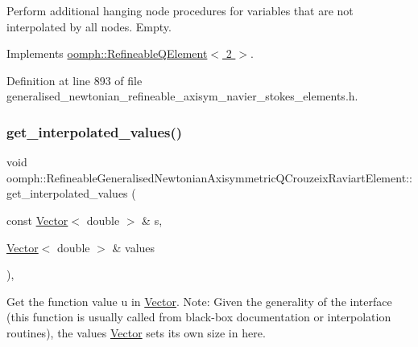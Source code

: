 Perform additional hanging node procedures for variables that are not interpolated by all nodes. Empty. 



Implements \hyperlink{classoomph_1_1RefineableQElement_3_012_01_4_a01e1eb063dd2c98ebb42d87959ca6b88}{oomph\+::\+Refineable\+Q\+Element$<$ 2 $>$}.



Definition at line 893 of file generalised\+\_\+newtonian\+\_\+refineable\+\_\+axisym\+\_\+navier\+\_\+stokes\+\_\+elements.\+h.

\mbox{\label{classoomph_1_1RefineableGeneralisedNewtonianAxisymmetricQCrouzeixRaviartElement_abf7fec1b21d8301f2e62198f95a5e45d}} 
\subsubsection{\texorpdfstring{get\+\_\+interpolated\+\_\+values()}{get\_interpolated\_values()}\hspace{0.1cm}{\footnotesize\ttfamily [1/2]}}
{\footnotesize\ttfamily void oomph\+::\+Refineable\+Generalised\+Newtonian\+Axisymmetric\+Q\+Crouzeix\+Raviart\+Element\+::get\+\_\+interpolated\+\_\+values (\begin{DoxyParamCaption}\item[{const \hyperlink{classoomph_1_1Vector}{Vector}$<$ double $>$ \&}]{s,  }\item[{\hyperlink{classoomph_1_1Vector}{Vector}$<$ double $>$ \&}]{values }\end{DoxyParamCaption})\hspace{0.3cm}{\ttfamily [inline]}, {\ttfamily [virtual]}}



Get the function value u in \hyperlink{classoomph_1_1Vector}{Vector}. Note\+: Given the generality of the interface (this function is usually called from black-\/box documentation or interpolation routines), the values \hyperlink{classoomph_1_1Vector}{Vector} sets its own size in here. 



